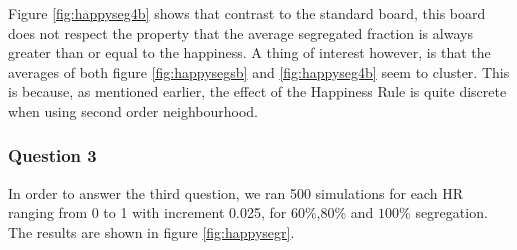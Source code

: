 Figure \ref{fig:happyseg4b} shows that contrast to the standard board, this board does not respect the property that the average segregated fraction is always greater than or equal to the happiness. 
A thing of interest however, is that the averages of both figure \ref{fig:happysegsb} and \ref{fig:happyseg4b} seem to cluster. 
This is because, as mentioned earlier, the effect of the Happiness Rule is quite discrete when using second order neighbourhood.

\subsubsection{Question 3}
In order to answer the third question, we ran 500 simulations for each HR ranging from 0 to 1 with increment 0.025, for $60\%$,$80\%$ and $100\%$ segregation.\\
The results are shown in figure \ref{fig:happysegr}.
